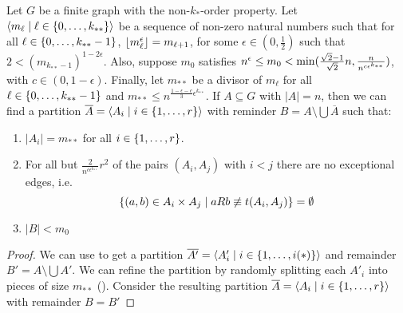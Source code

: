     \begin{lemma}[Claim 4.14] \label{lem:existance_of_equitative_partition_with_bound_exceptional_pairs}
        Let $G$ be a finite graph with the non-$k_{*}$-order property.
        Let $\left< m_\ell \mid \ell \in \{ 0, \dots, k_{**} \} \right>$ be a sequence of non-zero natural numbers such that
        for all $\ell \in \{ 0, \dots, k_{**}-1 \}$, $\left\lfloor m_\ell^\epsilon \right\rfloor = m_{\ell+1}$,
        for some $\epsilon \in (0, \frac{1}{2})$ such that $2 < (m_{k_{**}-1})^{1-2\epsilon}$.
        Also, suppose $m_0$ satisfies $n^\epsilon \leq m_0 < \min ( \frac{\sqrt{2}-1}{\sqrt{2}} n, \frac{n}{n^{c \epsilon^{k_{**}}}} )$,
        with $c \in (0, 1-\epsilon)$.
        Finally, let $m_{**}$ be a divisor of $m_\ell$ for all $\ell \in \{ 0, \dots, k_{**}-1 \}$ and
        $m_{**} \leq n^{\frac{1 - \epsilon - c}{3}\epsilon^{k_{**}}}$.
        If $A \subseteq G$ with $|A| = n$, then we can find a partition $\overline{A} = \left< A_i \mid i \in \{ 1, \dots, r \} \right>$
        with reminder $B = A \setminus \bigcup \overline{A}$ such that:
        \begin{enumerate}
            \item \label{itm:existance_of_equitative_partition_with_bound_exceptional_pairs.1} $|A_i| = m_{**}$ for all $i \in \{ 1, \dots, r \}$.
            \item \label{itm:existance_of_equitative_partition_with_bound_exceptional_pairs.2} For all but $\frac{2}{n^{c\epsilon^{k_{**}}}}r^2$ of the pairs
                $(A_i, A_j)$ with $i<j$ there are no exceptional edges, i.e.
                \[
                    \{ (a,b) \in A_i \times A_j \mid a R b \not\equiv t(A_i, A_j) \} = \emptyset
                \]
            \item \label{itm:existance_of_equitative_partition_with_bound_exceptional_pairs.3} $|B| < m_0$
        \end{enumerate}
        \begin{proof}
            We can use  to get a partition
            $\overline{A'} = \left< A'_i \mid i \in \{ 1, \dots, i(*) \} \right>$ and remainder $B' = A \setminus \bigcup A'$.
            We can refine the partition by randomly splitting each $A'_i$ into pieces of size $m_{**}$ ().
            Consider the resulting partition $\overline{A} = \left< A_i \mid i \in \{ 1, \dots, r \} \right>$ with remainder $B = B'$

\end{proof}
\end{lemma}
